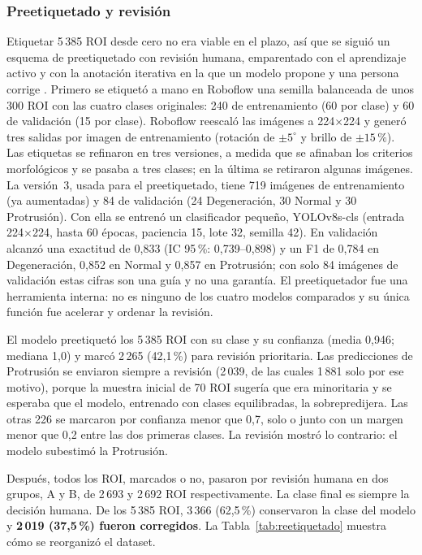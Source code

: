 \subsubsection{Preetiquetado y revisión}
Etiquetar 5\,385 ROI desde cero no era viable en el plazo, así que se siguió un esquema de preetiquetado con revisión humana, emparentado con el aprendizaje activo \cite{wang2024al} y con la anotación iterativa en la que un modelo propone y una persona corrige \cite{vandergraaf2024}. Primero se etiquetó a mano en Roboflow una semilla balanceada de unos 300 ROI con las cuatro clases originales: 240 de entrenamiento (60 por clase) y 60 de validación (15 por clase). Roboflow reescaló las imágenes a 224$\times$224 y generó tres salidas por imagen de entrenamiento (rotación de $\pm 5^{\circ}$ y brillo de $\pm 15\,\%$). Las etiquetas se refinaron en tres versiones, a medida que se afinaban los criterios morfológicos y se pasaba a tres clases; en la última se retiraron algunas imágenes. La versión~3, usada para el preetiquetado, tiene 719 imágenes de entrenamiento (ya aumentadas) y 84 de validación (24 Degeneración, 30 Normal y 30 Protrusión). Con ella se entrenó un clasificador pequeño, YOLOv8s-cls (entrada 224$\times$224, hasta 60 épocas, paciencia 15, lote 32, semilla 42). En validación alcanzó una exactitud de 0,833 (IC 95\,\%: 0,739--0,898) y un F1 de 0,784 en Degeneración, 0,852 en Normal y 0,857 en Protrusión; con solo 84 imágenes de validación estas cifras son una guía y no una garantía. El preetiquetador fue una herramienta interna: no es ninguno de los cuatro modelos comparados y su única función fue acelerar y ordenar la revisión.

El modelo preetiquetó los 5\,385 ROI con su clase y su confianza (media 0,946; mediana 1,0) y marcó 2\,265 (42,1\,\%) para revisión prioritaria. Las predicciones de Protrusión se enviaron siempre a revisión (2\,039, de las cuales 1\,881 solo por ese motivo), porque la muestra inicial de 70 ROI sugería que era minoritaria y se esperaba que el modelo, entrenado con clases equilibradas, la sobrepredijera. Las otras 226 se marcaron por confianza menor que 0,7, solo o junto con un margen menor que 0,2 entre las dos primeras clases. La revisión mostró lo contrario: el modelo subestimó la Protrusión.

Después, todos los ROI, marcados o no, pasaron por revisión humana en dos grupos, A y B, de 2\,693 y 2\,692 ROI respectivamente. La clase final es siempre la decisión humana. De los 5\,385 ROI, 3\,366 (62,5\,\%) conservaron la clase del modelo y \textbf{2\,019 (37,5\,\%) fueron corregidos}. La Tabla~\ref{tab:reetiquetado} muestra cómo se reorganizó el dataset.

